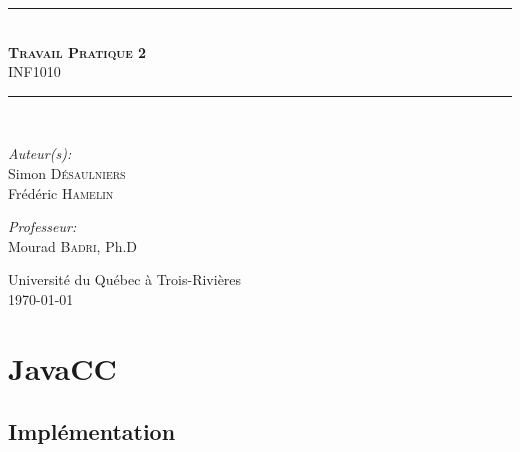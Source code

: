 \documentclass[11pt,french]{article}
\begin{document}
    \begin{titlepage}
        \begin{center}
            \noindent\rule{13cm}{1pt}\\[0.4cm]
            \textsc{\huge \bfseries Travail Pratique 2}\\
                                    INF1010\\[0.4cm]
            \noindent\rule{13cm}{1pt}\\[5cm]

            \begin{minipage}{0.4\textwidth}
                \begin{flushleft}
                \large\emph{Auteur(s):}\\[0.5cm]
                    Simon \textsc{Désaulniers}\\
                    Frédéric \textsc{Hamelin}
                \end{flushleft}
            \end{minipage}
            \begin{minipage}{0.5\textwidth}
                \begin{flushright} \large
                    \emph{Professeur:} \\[0.5cm]
                    Mourad \textsc{Badri}, Ph.D
                    \vspace{\parskip}
                \end{flushright}
            \end{minipage}

            \vfill
            {\large Université du Québec à Trois-Rivières\\ \today}
        \end{center}
        \thispagestyle{empty}
    \end{titlepage}

    \setcounter{page}{1}


    \section{JavaCC} %
    \label{sec:javacc}
        \subsection{Implémentation} %
        \label{sub:implementation}
\end{document}
